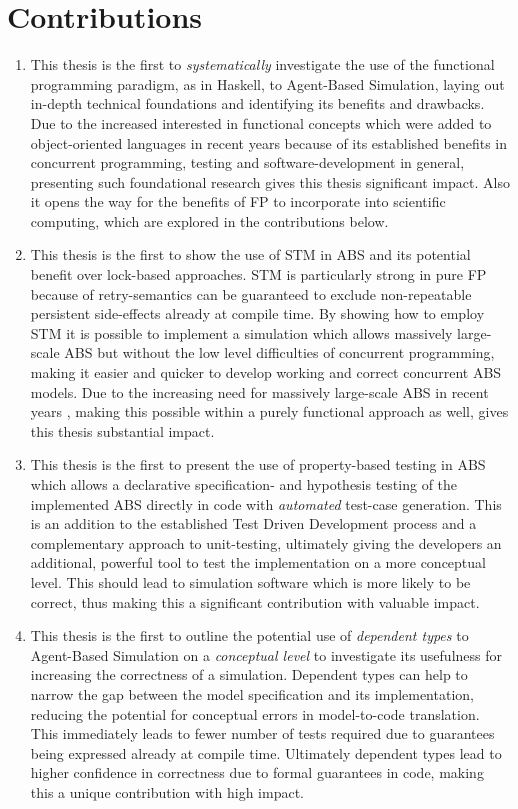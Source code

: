 \section{Contributions}
\begin{enumerate}
	\item This thesis is the first to \textit{systematically} investigate the use of the functional programming paradigm, as in Haskell, to Agent-Based Simulation, laying out in-depth technical foundations and identifying its benefits and drawbacks. Due to the increased interested in functional concepts which were added to object-oriented languages in recent years because of its established benefits in concurrent programming, testing and software-development in general, presenting such foundational research gives this thesis significant impact. Also it opens the way for the benefits of FP to incorporate into scientific computing, which are explored in the contributions below.
	
	\item This thesis is the first to show the use of STM in ABS and its potential benefit over lock-based approaches. STM is particularly strong in pure FP because of retry-semantics can be guaranteed to exclude non-repeatable persistent side-effects already at compile time. By showing how to employ STM it is possible to implement a simulation which allows massively large-scale ABS but without the low level difficulties of concurrent programming, making it easier and quicker to develop working and correct concurrent ABS models. Due to the increasing need for massively large-scale ABS in recent years \cite{lysenko_framework_2008}, making this possible within a purely functional approach as well, gives this thesis substantial impact.
	
	\item This thesis is the first to present the use of property-based testing in ABS which allows a declarative specification- and hypothesis testing of the implemented ABS directly in code with \textit{automated} test-case generation. This is an addition to the established Test Driven Development process and a complementary approach to unit-testing, ultimately giving the developers an additional, powerful tool to test the implementation on a more conceptual level. This should lead to simulation software which is more likely to be correct, thus making this a significant contribution with valuable impact.

	\item This thesis is the first to outline the potential use of \textit{dependent types} to Agent-Based Simulation on a \textit{conceptual level} to investigate its usefulness for increasing the correctness of a simulation. Dependent types can help to narrow the gap between the model specification and its implementation, reducing the potential for conceptual errors in model-to-code translation. This immediately leads to fewer number of tests required due to guarantees being expressed already at compile time. Ultimately dependent types lead to higher confidence in correctness due to formal guarantees in code, making this a unique contribution with high impact.
\end{enumerate}

